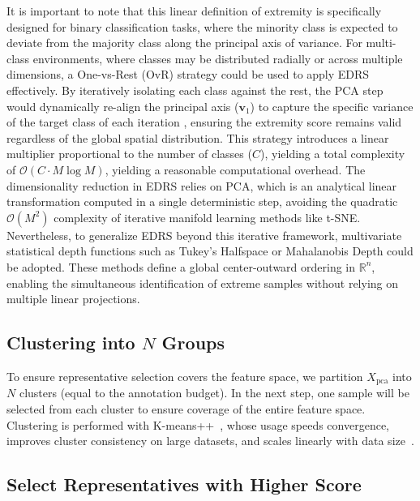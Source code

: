 \documentclass[preprint,12pt]{elsarticle}
\begin{document}
It is important to note that this linear definition of extremity is specifically designed for binary classification tasks, where the minority class is expected to deviate from the majority class along the principal axis of variance. For multi-class environments, where classes may be distributed radially or across multiple dimensions, a One-vs-Rest (OvR) strategy could be used to apply EDRS effectively. By iteratively isolating each class against the rest, the PCA step would dynamically re-align the principal axis ($\mathbf{v}_1$) to capture the specific variance of the target class of each iteration \cite{li2022trustworthy}, ensuring the extremity score remains valid regardless of the global spatial distribution. This strategy introduces a linear multiplier proportional to the number of classes ($C$), yielding a total complexity of $\mathcal{O}(C \cdot M \log M)$, yielding a reasonable computational overhead. The dimensionality reduction in EDRS relies on PCA, which is an analytical linear transformation computed in a single deterministic step, avoiding the quadratic $\mathcal{O}(M^2)$ complexity of iterative manifold learning methods like t-SNE. Nevertheless, to generalize EDRS beyond this iterative framework, multivariate statistical depth functions such as Tukey’s Halfspace or Mahalanobis Depth \cite{nagy2025halfspace, mozharovskyi2025anomaly} could be adopted. These methods define a global center-outward ordering in $\mathbb{R}^n$, enabling the simultaneous identification of extreme samples without relying on multiple linear projections.


\subsection{Clustering into $N$ Groups} \label{subsec:clustering_k_groups}

To ensure representative selection covers the feature space, we partition $X_{\text{pca}}$ into $N$ clusters (equal to the annotation budget). In the next step, one sample will be selected from each cluster to ensure coverage of the entire feature space. Clustering is performed with K-means++~\cite{roy2024impact,wang2022unsupervised}, whose usage speeds convergence, improves cluster consistency on large datasets, and scales linearly with data size~\cite{bachem2016fast}.

\subsection{Select Representatives with Higher Score} \label{subsec:select_representative_points}
\end{document}
